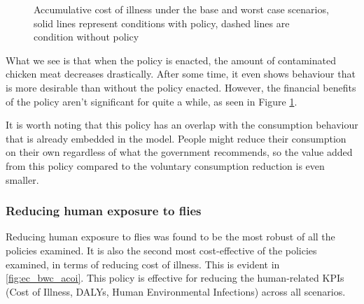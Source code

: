 \begin{figure}[h!]
\begin{minipage}{0.45\textwidth}
        \caption{Accumulative cost of illness under the base and worst case scenarios, solid lines represent conditions with policy, dashed lines are condition without policy}
        \label{fig:pc_bwc_acoi}
    \end{minipage}
\end{figure}

What we see is that when the policy is enacted, the amount of contaminated chicken meat decreases drastically. After some time, it even shows behaviour that is more desirable than without the policy enacted. However, the financial benefits of the policy aren't significant for quite a while, as seen in Figure \ref{fig:pc_bwc_acoi}. 

It is worth noting that this policy has an overlap with the consumption behaviour that is already embedded in the model. People might reduce their consumption on their own regardless of what the government recommends, so the value added from this policy compared to the voluntary consumption reduction is even smaller.

\subsubsection{Reducing human exposure to flies}
\label{reducing human exposure to flies}
Reducing human exposure to flies was found to be the most robust of all the policies examined. It is also the second most cost-effective of the policies examined, in terms of reducing cost of illness. This is evident in \ref{fig:ec_bwc_acoi}. This policy is effective for reducing the human-related KPIs (Cost of Illness, DALYs, Human Environmental Infections) across all scenarios. 

